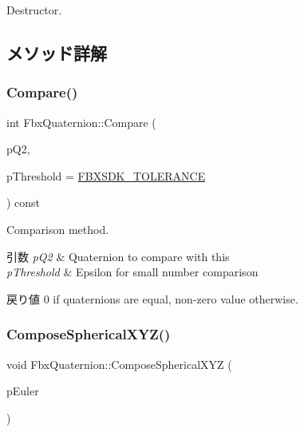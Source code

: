 Destructor. 



\subsection{メソッド詳解}
\mbox{\label{class_fbx_quaternion_a6e2200de81315f788b0bf80d553f1f65}} 
\subsubsection{\texorpdfstring{Compare()}{Compare()}}
{\footnotesize\ttfamily int Fbx\+Quaternion\+::\+Compare (\begin{DoxyParamCaption}\item[{const \hyperlink{class_fbx_quaternion}{Fbx\+Quaternion} \&}]{p\+Q2,  }\item[{const double}]{p\+Threshold = {\ttfamily \hyperlink{fbxtypes_8h_acf3cd6f208edb42ad9c9abbc1f7feea0}{F\+B\+X\+S\+D\+K\+\_\+\+T\+O\+L\+E\+R\+A\+N\+CE}} }\end{DoxyParamCaption}) const}

Comparison method. 
\begin{DoxyParams}{引数}
{\em p\+Q2} & Quaternion to compare with this \\
\hline
{\em p\+Threshold} & Epsilon for small number comparison \\
\hline
\end{DoxyParams}
\begin{DoxyReturn}{戻り値}
0 if quaternions are equal, non-\/zero value otherwise. 
\end{DoxyReturn}
\mbox{\label{class_fbx_quaternion_a226f76a65db79665179df625f8c57c2d}} 
\subsubsection{\texorpdfstring{Compose\+Spherical\+X\+Y\+Z()}{ComposeSphericalXYZ()}}
{\footnotesize\ttfamily void Fbx\+Quaternion\+::\+Compose\+Spherical\+X\+YZ (\begin{DoxyParamCaption}\item[{const \hyperlink{class_fbx_vector4}{Fbx\+Vector4}}]{p\+Euler }\end{DoxyParamCaption})}

